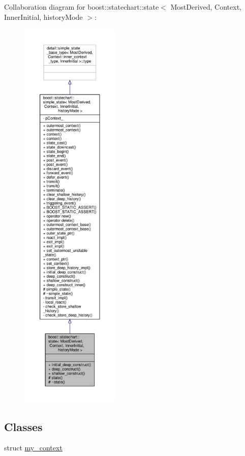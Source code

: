 Collaboration diagram for boost\+:\+:statechart\+:\+:state$<$ Most\+Derived, Context, Inner\+Initial, history\+Mode $>$\+:
\nopagebreak
\begin{figure}[H]
\begin{center}
\leavevmode
\includegraphics[height=550pt]{classboost_1_1statechart_1_1state__coll__graph}
\end{center}
\end{figure}
\subsection*{Classes}
\begin{DoxyCompactItemize}
\item 
struct \mbox{\hyperlink{structboost_1_1statechart_1_1state_1_1my__context}{my\+\_\+context}}
\end{DoxyCompactItemize}
